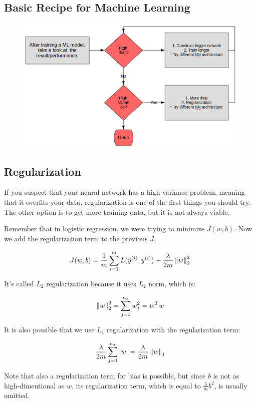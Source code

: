 \subsection{Basic Recipe for Machine Learning}
\begin{figure}[H]
    \includegraphics[scale=0.7]{images/recipe.png}
    \centering
\end{figure}

\subsection{Regularization}
If you suspect that your neural network has a high variance problem, meaning that it overfits your data, regularization is one of the first things you should try. The other option is to get more training data, but it is not always viable. 

Remember that in logistic regression, we were trying to minimize $J(w, b)$. Now we add the regularization term to the previous $J$.

$$
J(w, b) = \frac{1}{m}\sum_{i=1}^{m}{L(\hat{y}^{(i)}, y^{(i)})}+ \frac{\lambda}{2m} \left\lVert w\right\rVert_2^{2}
$$ 

It's called $L_2$ regularization because it uses $L_2$ norm, which is: 

$$
\left\lVert w\right\rVert_2^2 = \sum_{j=1}^{n_x} w_j^2 = w^T w
$$

It is also possible that we use $L_1$ regularization with the regularization term: 

$$
\frac{\lambda}{2m}\sum_{j=1}^{n_x} |w| = \frac{\lambda}{2m}\left\lVert w\right\rVert_1
$$


Note that also a regularization term for bias is possible, but since $b$ is not as high-dimentional as $w$, its regularization term, which is equal to $\frac{\lambda}{m}b^2$, is usually omitted.

